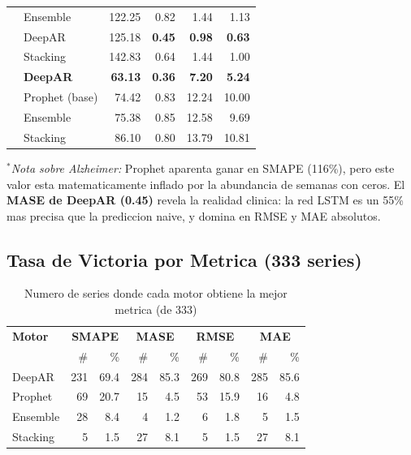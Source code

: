 \documentclass[12pt, letterpaper]{article}
\begin{document}
\begin{table}[H]
\begin{tabular}{ll rrrr}
  & Ensemble          & 122.25                & 0.82   & 1.44           & 1.13 \\
  & DeepAR            & 125.18                & \textbf{0.45} & \textbf{0.98} & \textbf{0.63} \\
  & Stacking          & 142.83                & 0.64   & 1.44           & 1.00 \\
\midrule
\rowcolor{cream!50}
\multirow{4}{*}{\textbf{Global (333)}}
  & \textbf{DeepAR}   & \textbf{63.13} & \textbf{0.36} & \textbf{7.20}  & \textbf{5.24} \\
  & Prophet (base)    & 74.42          & 0.83          & 12.24          & 10.00 \\
  & Ensemble          & 75.38          & 0.85          & 12.58          & 9.69 \\
  & Stacking          & 86.10          & 0.80          & 13.79          & 10.81 \\
\bottomrule
\end{tabular}
\vspace{0.2cm}

{\scriptsize $^{*}$\textit{Nota sobre Alzheimer:} Prophet aparenta ganar en SMAPE (116\%), pero este valor esta matematicamente inflado por la abundancia de semanas con ceros. El \textbf{MASE de DeepAR (0.45)} revela la realidad clinica: la red LSTM es un 55\% mas precisa que la prediccion naive, y domina en RMSE y MAE absolutos.}
\end{table}

\subsection{Tasa de Victoria por Metrica (333 series)}

\begin{table}[H]
\centering
\caption{Numero de series donde cada motor obtiene la mejor metrica (de 333)}
\label{tab:winrate}
\small
\begin{tabular}{l rr rr rr rr}
\toprule
\textbf{Motor} & \multicolumn{2}{c}{\textbf{SMAPE}} & \multicolumn{2}{c}{\textbf{MASE}} & \multicolumn{2}{c}{\textbf{RMSE}} & \multicolumn{2}{c}{\textbf{MAE}} \\
               & \#  & \%    & \#  & \%    & \#  & \%    & \#  & \%    \\
\midrule
\rowcolor{cdeepar!8}
DeepAR         & 231 & 69.4  & 284 & 85.3  & 269 & 80.8  & 285 & 85.6  \\
Prophet        & 69  & 20.7  & 15  & 4.5   & 53  & 15.9  & 16  & 4.8   \\
Ensemble       & 28  & 8.4   & 4   & 1.2   & 6   & 1.8   & 5   & 1.5   \\
Stacking       & 5   & 1.5   & 27  & 8.1   & 5   & 1.5   & 27  & 8.1   \\
\bottomrule
\end{tabular}
\end{table}
\end{document}
